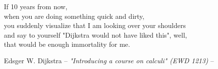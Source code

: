\thispagestyle{empty}
\vspace*{3cm}

\begin{center}
If 10 years from now, \\
when you are doing something quick and dirty, \\
you suddenly visualize that I am looking over your shoulders \\
and say to yourself "Dijkstra would not have liked this", well, \\
that would be enough immortality for me. 


Edsger W. Dijkstra -- \emph{"Introducing a course on calculi" (EWD 1213)} --
\end{center}

\medskip

